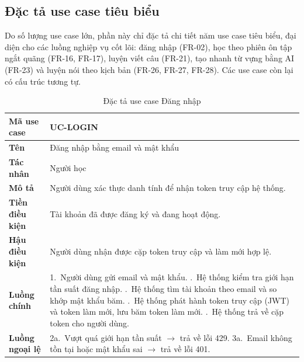 \subsection{Đặc tả use case tiêu biểu}
\label{subsec:dac-ta-usecase}

Do số lượng use case lớn, phần này chỉ đặc tả chi tiết năm use case tiêu
biểu, đại diện cho các luồng nghiệp vụ cốt lõi: đăng nhập (FR-02), học theo
phiên ôn tập ngắt quãng (FR-16, FR-17), luyện viết câu (FR-21), tạo nhanh
từ vựng bằng AI (FR-23) và luyện nói theo kịch bản (FR-26, FR-27, FR-28).
Các use case còn lại có cấu trúc tương tự.

\begin{table}[H]
  \centering
  \small
  \renewcommand{\arraystretch}{1.3}
  \begin{tabular}{|p{3.0cm}|p{11.4cm}|}
    \hline
    \textbf{Mã use case} & UC-LOGIN \\ \hline
    \textbf{Tên} & Đăng nhập bằng email và mật khẩu \\ \hline
    \textbf{Tác nhân} & Người học \\ \hline
    \textbf{Mô tả} & Người dùng xác thực danh tính để nhận token truy cập hệ thống. \\ \hline
    \textbf{Tiền điều kiện} & Tài khoản đã được đăng ký và đang hoạt động. \\ \hline
    \textbf{Hậu điều kiện} & Người dùng nhận được cặp token truy cập và làm mới hợp lệ. \\ \hline
    \textbf{Luồng chính} &
      1.~Người dùng gửi email và mật khẩu. \newline
      2.~Hệ thống kiểm tra giới hạn tần suất đăng nhập. \newline
      3.~Hệ thống tìm tài khoản theo email và so khớp mật khẩu băm. \newline
      4.~Hệ thống phát hành token truy cập (JWT) và token làm mới, lưu băm token làm mới. \newline
      5.~Hệ thống trả về cặp token cho người dùng. \\ \hline
    \textbf{Luồng ngoại lệ} &
      2a.~Vượt quá giới hạn tần suất $\rightarrow$ trả về lỗi 429. \newline
      3a.~Email không tồn tại hoặc mật khẩu sai $\rightarrow$ trả về lỗi 401. \\ \hline
  \end{tabular}
  \caption{Đặc tả use case Đăng nhập}
  \label{tab:uc-login}
\end{table}

